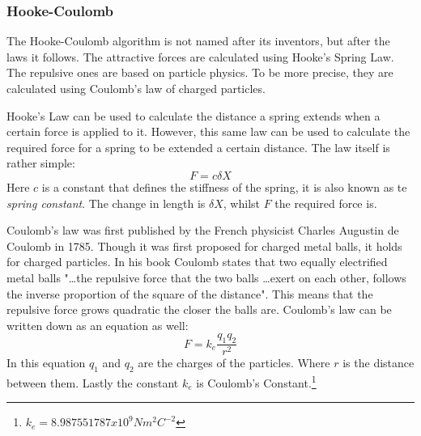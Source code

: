 \documentclass[a4paper,12pt]{article}
\begin{document}
    \subsubsection{Hooke-Coulomb}
    The Hooke-Coulomb algorithm is not named after its inventors, but after the laws it follows.
    The attractive forces are calculated using Hooke's Spring Law.
    The repulsive ones are based on particle physics.
    To be more precise, they are calculated using Coulomb's law of charged particles.

    Hooke's Law can be used to calculate the distance a spring extends when a certain force is applied to it.
    However, this same law can be used to calculate the required force for a spring to be extended a certain distance.
    The law itself is rather simple:
    \begin{equation}
      F = c \delta X
    \end{equation}
    Here $c$ is a constant that defines the stiffness of the spring, it is also known as te \emph{spring constant}.
    The change in length is $\delta X$, whilst $F$ the required force is.

    Coulomb's law was first published by the French physicist Charles Augustin de Coulomb in 1785.\cite{coulomb1785premier}
    Though it was first proposed for charged metal balls, it holds for charged particles.
    In his book Coulomb states that two equally electrified metal balls "\ldots the repulsive force that the two balls \ldots exert on each other, follows the inverse proportion of the square of the distance".
    This means that the repulsive force grows quadratic the closer the balls are.
    Coulomb's law can be written down as an equation as well:
    \begin{equation}
      F = k_e \frac{q_1 q_2}{r^2}
    \end{equation}
     In this equation $q_1$ and $q_2$ are the charges of the particles.
    Where $r$ is the distance between them. Lastly the constant $k_e$ is Coulomb's Constant.\footnote{$k_e = 8.987551787 x 10^9 N m^2 C^{-2}$}
\end{document}
